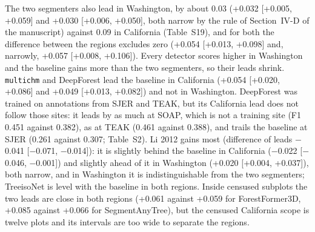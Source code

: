 \documentclass[10pt]{article}
\begin{document}
The two segmenters also lead in Washington, by about 0.03 (+0.032 [+0.005,
+0.059] and +0.030 [+0.006, +0.050], both narrow by the rule of Section~IV-D of
the manuscript) against 0.09 in California (Table~S19), and for both the
difference between the regions excludes zero (+0.054 [+0.013, +0.098] and,
narrowly, +0.057 [+0.008, +0.106]). Every detector scores higher in Washington
and the baseline gains more than the two segmenters, so their leads shrink.
\texttt{multichm} and DeepForest lead the baseline in California (+0.054 [+0.020,
+0.086] and +0.049 [+0.013, +0.082]) and not in Washington. DeepForest was
trained on annotations from SJER and TEAK, but its California lead does not
follow those sites: it leads by as much at SOAP, which is not a training site
(F1 0.451 against 0.382), as at TEAK (0.461 against 0.388), and trails the
baseline at SJER (0.261 against 0.307; Table~S2). Li 2012 gains most (difference
of leads $-$0.041 [$-$0.071, $-$0.014]): it is slightly behind the baseline in
California ($-$0.022 [$-$0.046, $-$0.001]) and slightly ahead of it in Washington
(+0.020 [+0.004, +0.037]), both narrow, and in Washington it is
indistinguishable from the two segmenters; TreeisoNet is level with the baseline
in both regions. Inside censused subplots the two leads are close in both
regions (+0.061 against +0.059 for ForestFormer3D, +0.085 against +0.066 for
SegmentAnyTree), but the censused California scope is twelve plots and its
intervals are too wide to separate the regions.
\end{document}
